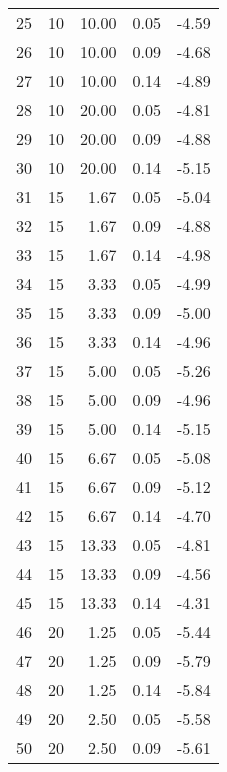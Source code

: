 \begin{tabular}{rrrrr}
    25 &        10 &  10.00 & 0.05 &                  -4.59 \\
    26 &        10 &  10.00 & 0.09 &                  -4.68 \\
    27 &        10 &  10.00 & 0.14 &                  -4.89 \\
    28 &        10 &  20.00 & 0.05 &                  -4.81 \\
    29 &        10 &  20.00 & 0.09 &                  -4.88 \\
    30 &        10 &  20.00 & 0.14 &                  -5.15 \\
    31 &        15 &   1.67 & 0.05 &                  -5.04 \\
    32 &        15 &   1.67 & 0.09 &                  -4.88 \\
    33 &        15 &   1.67 & 0.14 &                  -4.98 \\
    34 &        15 &   3.33 & 0.05 &                  -4.99 \\
    35 &        15 &   3.33 & 0.09 &                  -5.00 \\
    36 &        15 &   3.33 & 0.14 &                  -4.96 \\
    37 &        15 &   5.00 & 0.05 &                  -5.26 \\
    38 &        15 &   5.00 & 0.09 &                  -4.96 \\
    39 &        15 &   5.00 & 0.14 &                  -5.15 \\
    40 &        15 &   6.67 & 0.05 &                  -5.08 \\
    41 &        15 &   6.67 & 0.09 &                  -5.12 \\
    42 &        15 &   6.67 & 0.14 &                  -4.70 \\
    43 &        15 &  13.33 & 0.05 &                  -4.81 \\
    44 &        15 &  13.33 & 0.09 &                  -4.56 \\
    45 &        15 &  13.33 & 0.14 &                  -4.31 \\
    46 &        20 &   1.25 & 0.05 &                  -5.44 \\
    47 &        20 &   1.25 & 0.09 &                  -5.79 \\
    48 &        20 &   1.25 & 0.14 &                  -5.84 \\
    49 &        20 &   2.50 & 0.05 &                  -5.58 \\
    50 &        20 &   2.50 & 0.09 &                  -5.61 \\

\end{tabular}
